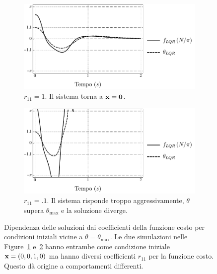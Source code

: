 \begin{figure}
    \vskip 0pt
    \centering
    \begin{subfigure}[t]{0.48\textwidth}
        \centering
        \includegraphics[width=\textwidth]{assets/occasional-blowup-r1}
        \caption{$r_{11} = 1$. Il sistema torna a $\mathbf{x} = \mathbf{0}$.}
        \label{fig:does-not-blowup}
    \end{subfigure}
    \hfill
    \begin{subfigure}[t]{0.48\textwidth}
        \centering
        \includegraphics[width=\textwidth]{assets/occasional-blowup-r.1}
        \caption{$r_{11} = .1$. Il sistema risponde troppo
            aggressivamente, $\theta$ supera $\theta_{\max}$ e la soluzione diverge.}
        \label{fig:does-blowup}
    \end{subfigure}
    \caption[Dipendenza delle soluzioni dalla funzione costo]{
        Dipendenza delle soluzioni dai coefficienti della funzione costo
        per condizioni iniziali vicine a $\theta = \theta_{\max}$.
        Le due simulazioni nelle Figure~\ref{fig:does-not-blowup} e~\ref{fig:does-blowup}
        hanno entrambe come condizione iniziale $\mathbf{x} = (0, 0, 1, 0)$ ma
        hanno diversi coefficienti $r_{11}$ per la funzione costo. Questo
        dà origine a comportamenti differenti.
    }
    \label{fig:occasional-blowup}
\end{figure}



